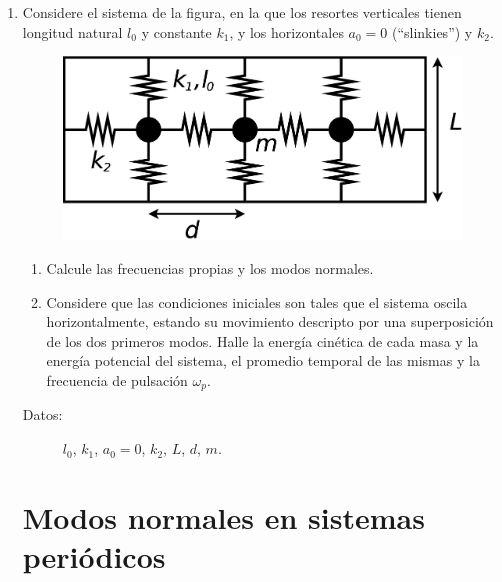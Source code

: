 \documentclass[11pt,spanish,a4paper]{article}
\begin{document}
\begin{enumerate}
\item Considere el sistema de la figura, en la que los resortes verticales tienen longitud natural $l_0$ y constante $k_1$, y los horizontales
$a_0= 0$ (``slinkies'') y $k_2$.
\begin{figure}[H]
\centering{}\includegraphics[clip,scale=0.25]{ej1-10}
\end{figure}
\begin{enumerate}
	\item Calcule las frecuencias propias y los modos normales. 
	\item Considere que las condiciones iniciales son tales que el sistema oscila horizontalmente, estando su movimiento descripto por una superposición de los dos primeros modos.
	Halle la energía cinética de cada masa y la energía potencial del sistema, el promedio temporal de las mismas y la frecuencia de pulsación $\omega_{p}$.
\end{enumerate}
\begin{description}
	\item [{Datos:}] $l_{0}$, $k_{1}$, $a_{0}=0$, $k_{2}$, $L$, $d$, $m$.
\end{description}



\section*{Modos normales en sistemas periódicos}



\end{enumerate}
\end{document}
